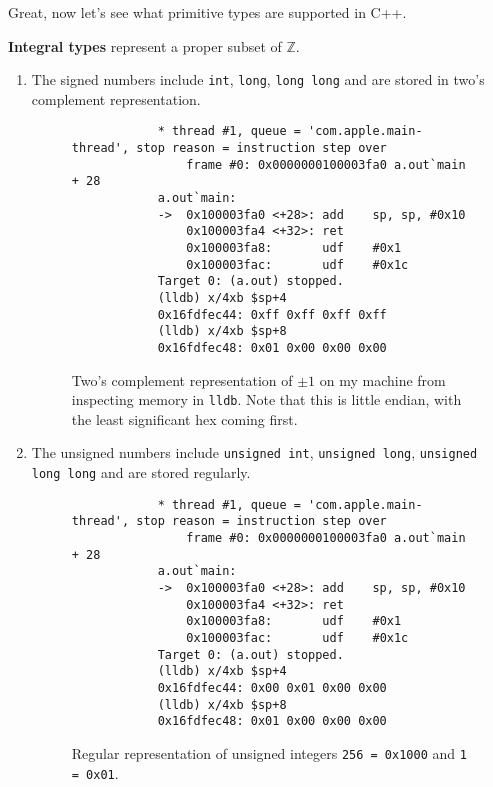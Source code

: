 \documentclass{article}
\begin{document}
    Great, now let's see what primitive types are supported in C++.  
    
    \begin{definition}
      \textbf{Integral types} represent a proper subset of $\mathbb{Z}$. 
      \begin{enumerate}
        \item The signed numbers include \texttt{int}, \texttt{long}, \texttt{long long} and are stored in two's complement representation. 

        \begin{figure}[H]
          \centering 
          \begin{lstlisting}
            * thread #1, queue = 'com.apple.main-thread', stop reason = instruction step over
                frame #0: 0x0000000100003fa0 a.out`main + 28
            a.out`main:
            ->  0x100003fa0 <+28>: add    sp, sp, #0x10
                0x100003fa4 <+32>: ret    
                0x100003fa8:       udf    #0x1
                0x100003fac:       udf    #0x1c
            Target 0: (a.out) stopped.
            (lldb) x/4xb $sp+4
            0x16fdfec44: 0xff 0xff 0xff 0xff
            (lldb) x/4xb $sp+8
            0x16fdfec48: 0x01 0x00 0x00 0x00
          \end{lstlisting}
          \caption{Two's complement representation of $\pm1$ on my machine from inspecting memory in \texttt{lldb}. Note that this is little endian, with the least significant hex coming first.} 
          \label{fig:signed_rep}
        \end{figure} 

        \item The unsigned numbers include \texttt{unsigned int}, \texttt{unsigned long}, \texttt{unsigned long long} and are stored regularly. 

        \begin{figure}[H]
          \centering 
          \begin{lstlisting}
            * thread #1, queue = 'com.apple.main-thread', stop reason = instruction step over
                frame #0: 0x0000000100003fa0 a.out`main + 28
            a.out`main:
            ->  0x100003fa0 <+28>: add    sp, sp, #0x10
                0x100003fa4 <+32>: ret    
                0x100003fa8:       udf    #0x1
                0x100003fac:       udf    #0x1c
            Target 0: (a.out) stopped.
            (lldb) x/4xb $sp+4
            0x16fdfec44: 0x00 0x01 0x00 0x00
            (lldb) x/4xb $sp+8
            0x16fdfec48: 0x01 0x00 0x00 0x00
          \end{lstlisting}
          \caption{Regular representation of unsigned integers \texttt{256 = 0x1000} and \texttt{1 = 0x01}. }
          \label{fig:unsigned_rep}
        \end{figure} 
      \end{enumerate}
    \end{definition} 
\end{document}
